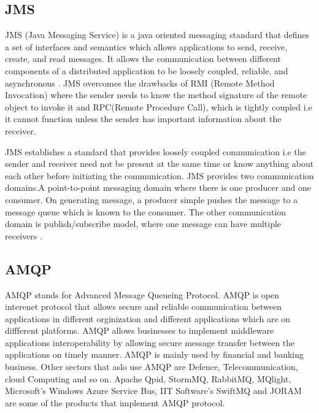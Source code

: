 \subsection{JMS}

     JMS (Java Messaging Service) is a java oriented messaging
     standard that defines a set of interfaces and semantics which
     allows applications to send, receive, create, and read messages.
     It allows the communication between different components of a
     distributed application to be loosely coupled, reliable, and
     asynchronous \cite{www-jms-wiki}. JMS overcomes the drawbacks of
     RMI (Remote Method Invocation) where the sender needs to know the
     method signature of the remote object to invoke it and RPC(Remote
     Procedure Call), which is tightly coupled i.e it cannot function
     unless the sender has important information about the receiver.

     JMS establishes a standard that provides loosely coupled
     communication i.e the sender and receiver need not be present at
     the same time or know anything about each other before initiating
     the communication.  JMS provides two communication domains.A
     point-to-point messaging domain where there is one producer and
     one consumer. On generating message, a producer simple pushes the
     message to a message queue which is known to the consumer. The
     other communication domain is publish/subscribe model, where one
     message can have multiple receivers \cite{www-jms-oracle-docs}.

\subsection{AMQP}

     \cite{www-amqp} AMQP stands for Advanced Message Queueing
     Protocol. AMQP is open interenet protocol that allows secure and
     reliable communication between applications in different
     orginization and different applications which are on diffferent
     platforms. AMQP allows businesses to implement middleware
     applications interoperability by allowing secure message transfer
     between the applications on timely manner. AMQP is mainly used by
     financial and banking business. Other sectors that aslo use AMQP
     are Defence, Telecommunication, cloud Computing and so on.
     Apache Qpid, StormMQ, RabbitMQ, MQlight, Microsoft's Windows
     Azure Service Bus, IIT Software's SwiftMQ and JORAM are some of
     the products that implement AMQP protocol.

